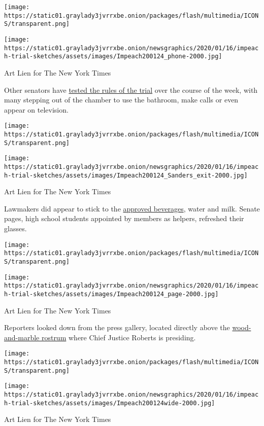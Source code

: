 \texttt{[image: https://static01.graylady3jvrrxbe.onion/packages/flash/multimedia/ICONS/transparent.png]}

\texttt{[image: https://static01.graylady3jvrrxbe.onion/newsgraphics/2020/01/16/impeach-trial-sketches/assets/images/Impeach200124\_phone-2000.jpg]}

Art Lien for The New York Times

Other senators have
\href{https://www.nytimes3xbfgragh.onion/2020/01/23/us/politics/senators-impeachment-scene.html}{tested
the rules of the trial} over the course of the week, with many stepping
out of the chamber to use the bathroom, make calls or even appear on
television.

\texttt{[image: https://static01.graylady3jvrrxbe.onion/packages/flash/multimedia/ICONS/transparent.png]}

\texttt{[image: https://static01.graylady3jvrrxbe.onion/newsgraphics/2020/01/16/impeach-trial-sketches/assets/images/Impeach200124\_Sanders\_exit-2000.jpg]}

Art Lien for The New York Times

Lawmakers did appear to stick to the
\href{https://www.google.com/url?q=https://www.nytimes3xbfgragh.onion/2020/01/22/us/senate-candy-desk-impeachment.html\&sa=D\&ust=1579918389860000\&usg=AFQjCNEIOwzbED7eInN7snmNi2g6uUo8aQ}{approved
beverages}, water and milk. Senate pages, high school students appointed
by members as helpers, refreshed their glasses.

\texttt{[image: https://static01.graylady3jvrrxbe.onion/packages/flash/multimedia/ICONS/transparent.png]}

\texttt{[image: https://static01.graylady3jvrrxbe.onion/newsgraphics/2020/01/16/impeach-trial-sketches/assets/images/Impeach200124\_page-2000.jpg]}

Art Lien for The New York Times

Reporters looked down from the press gallery, located directly above the
\href{https://www.nytimes3xbfgragh.onion/interactive/2020/01/23/us/politics/impeachment-senate-chamber-diagram.html}{wood-and-marble
rostrum} where Chief Justice Roberts is presiding.

\texttt{[image: https://static01.graylady3jvrrxbe.onion/packages/flash/multimedia/ICONS/transparent.png]}

\texttt{[image: https://static01.graylady3jvrrxbe.onion/newsgraphics/2020/01/16/impeach-trial-sketches/assets/images/Impeach200124wide-2000.jpg]}

Art Lien for The New York Times

